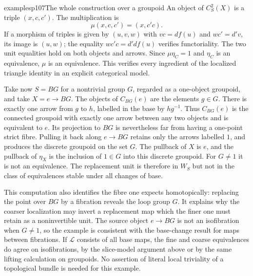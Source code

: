 \begin{dcomment}{examples}{p107}{The whole construction over a groupoid}
An object of $C_S^2(X)$ is a triple $(x,c,c')$. The multiplication is
\[
\mu(x,c,c')=(x,c'c).
\]
If a morphism of triples is given by $(u,v,w)$ with $vc=df(u)$ and $wc'=d'v$, its image is $(u,w)$; the equality $wc'c=d'df(u)$ verifies functoriality. The two unit equalities hold on both objects and arrows. Since $\mu\eta_C=1$ and $\eta_C$ is an equivalence, $\mu$ is an equivalence. This verifies every ingredient of the localized triangle identity in an explicit categorical model.

Take now $S=BG$ for a nontrivial group $G$, regarded as a one-object groupoid, and take $X=e\to BG$. The objects of $C_{BG}(e)$ are the elements $g\in G$. There is exactly one arrow from $g$ to $h$, labelled in the base by $hg^{-1}$. Thus $C_{BG}(e)$ is the connected groupoid with exactly one arrow between any two objects and is equivalent to $e$. Its projection to $BG$ is nevertheless far from having a one-point strict fibre. Pulling it back along $e\to BG$ retains only the arrows labelled $1$, and produces the discrete groupoid on the set $G$. The pullback of $X$ is $e$, and the pullback of $\eta_X$ is the inclusion of $1\in G$ into this discrete groupoid. For $G\ne1$ it is not an equivalence. The replacement unit is therefore in $W_S$ but not in the class of equivalences stable under all changes of base.

This computation also identifies the fibre one expects homotopically: replacing the point over $BG$ by a fibration reveals the loop group $G$. It explains why the coarser localization may invert a replacement map which the finer one must retain as a noninvertible unit. The source object $e\to BG$ is not an isofibration when $G\ne1$, so the example is consistent with the base-change result for maps between fibrations. If $\mathcal L$ consists of all base maps, the fine and coarse equivalences do agree on isofibrations, by the slice-model argument above or by the same lifting calculation on groupoids. No assertion of literal local triviality of a topological bundle is needed for this example.
\end{dcomment}

